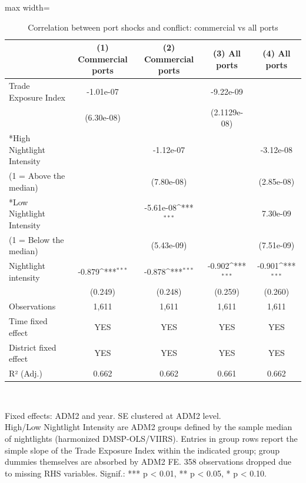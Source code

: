 \begin{table}[htbp]
	\centering
	\caption{Correlation between port shocks and conflict: commercial vs all ports}
	\label{tab:ports_main}
	\begingroup
	\def\sym#1{\ifmmode^{#1}\else\(^{#1}\)\fi}
	\begin{adjustbox}{max width=\textwidth}
		\begin{tabular}{lcccc}
			\toprule
			& (1) Commercial ports & (2) Commercial ports & (3) All ports & (4) All ports \\
			\midrule
			Trade Exposure Index        & -1.01e-07    &             &        -9.22e-09     &             \\
			& (6.30e-08)   &             &   (2.1129e-08)       &             \\
			\addlinespace[0.25em]
			*High Nightlight Intensity       &              & -1.12e-07   &             &   -3.12e-08             \\
			(1 = Above the median)&              & (7.80e-08)  &             &           (2.85e-08)  \\
			*Low Nightlight Intensity        &              & -5.61e-08\sym{***} &       & 7.30e-09           \\
			(1 = Below the median)			&              & (5.43e-09)  &             &    (7.51e-09)         \\
			\addlinespace[0.25em]
			
			\addlinespace[0.25em]
			Nightlight intensity     & -0.879\sym{***} & -0.878\sym{***} & -0.902\sym{***} & -0.901\sym{***} \\
			& (0.249)     & (0.248)     & (0.259)     & (0.260)     \\
			\midrule
			Observations         & 1,611       & 1,611       & 1,611       & 1,611       \\
			Time fixed effect     & YES       & YES       & YES       & YES      \\
			District fixed effect           & YES       & YES       & YES       & YES       \\
			R² (Adj.)          & 0.662       & 0.662       & 0.661       & 0.662       \\
			\hline
		\end{tabular}
		\end{adjustbox}
		\vspace{3pt}
		\\[2pt]
		\begin{minipage}{1\textwidth}
			\footnotesize Fixed effects: ADM2 and year. SE clustered at ADM2 level. \\
			High/Low Nightlight Intensity are ADM2 groups defined by the sample median of nightlights (harmonized DMSP-OLS/VIIRS). Entries in group rows report the simple slope of the Trade Exposure Index within the indicated group; group dummies themselves are absorbed by ADM2 FE. 358 observations dropped due to missing RHS variables. Signif.: *** p < 0.01, ** p < 0.05, * p < 0.10.
		\end{minipage}
	\endgroup
\end{table}

